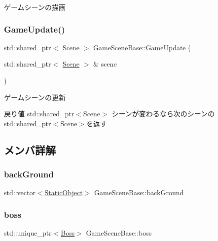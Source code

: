ゲームシーンの描画 

\mbox{\label{class_game_scene_base_ae9dab92c5cb057a884d12d21fe823fd9}} 
\subsubsection{\texorpdfstring{Game\+Update()}{GameUpdate()}}
{\footnotesize\ttfamily std\+::shared\+\_\+ptr$<$ \mbox{\hyperlink{class_scene}{Scene}} $>$ Game\+Scene\+Base\+::\+Game\+Update (\begin{DoxyParamCaption}\item[{std\+::shared\+\_\+ptr$<$ \mbox{\hyperlink{class_scene}{Scene}} $>$ \&}]{scene }\end{DoxyParamCaption})}



ゲームシーンの更新 

\begin{DoxyReturn}{戻り値}
std\+::shared\+\_\+ptr$<$\+Scene$>$ シーンが変わるなら次のシーンのstd\+::shared\+\_\+ptr$<$\+Scene$>$を返す 
\end{DoxyReturn}


\subsection{メンバ詳解}
\mbox{\label{class_game_scene_base_a0c60c7b970f081b2eee1ac14d74f6a7e}} 
\subsubsection{\texorpdfstring{back\+Ground}{backGround}}
{\footnotesize\ttfamily std\+::vector$<$\mbox{\hyperlink{class_static_object}{Static\+Object}}$>$ Game\+Scene\+Base\+::back\+Ground}

\mbox{\label{class_game_scene_base_a8de41f067f4a7ed1e41f60836ea1b1e5}} 
\subsubsection{\texorpdfstring{boss}{boss}}
{\footnotesize\ttfamily std\+::unique\+\_\+ptr$<$\mbox{\hyperlink{class_boss}{Boss}}$>$ Game\+Scene\+Base\+::boss}

